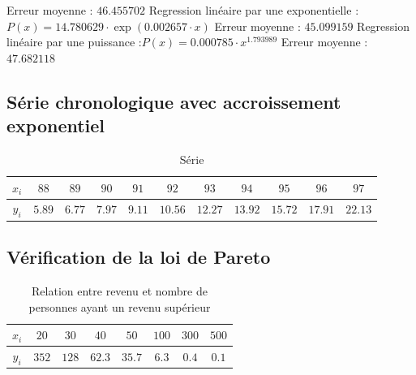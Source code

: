 \documentclass{report}
\begin{document}
	Erreur moyenne : $46.455702$
	\newline
	\newline
	Regression linéaire par une exponentielle :$P(x) = 14.780629 \cdot \exp(0.002657 \cdot x)$
	\newline
	Erreur moyenne : $45.099159$
	\newline
	\newline
	Regression linéaire par une puissance :$P(x) = 0.000785  \cdot x^{1.793989}$
	\newline
	Erreur moyenne : $47.682118$
      \newpage
      
      \subsection{Série chronologique avec accroissement exponentiel}
      
	\begin{table}[h]
	  \centering
	  \begin{tabular}{| c | c | c | c | c | c | c | c | c | c | c |}
	    \hline 
	    $x_{i}$ & $88$ & $89$ & $90$ & $91$ & $92$ & $93$ & $94$ & $95$ & $96$ & $97$ \\ 
	    \hline 
	    $y_{i}$ & $5.89$ & $6.77$ & $7.97$ & $9.11$ & $10.56$ & $12.27$ & $13.92$ & $15.72$ & $17.91$ & $22.13$ \\ 
	    \hline 
	  \end{tabular}
	  \caption{Série}
	  \label{approx_tp2_ex4}
	\end{table}
      \newpage
      
      \subsection{Vérification de la loi de Pareto}
	\begin{table}[h]
	  \centering
	  \begin{tabular}{| c | c | c | c | c | c | c | c |}
	      \hline 
	      $x_{i}$ & $20$ & $30$ & $40$ & $50$ & $100$ & $300$ & $500$ \\ 
	      \hline 
	      $y_{i}$ & $352$ & $128$ & $62.3$ & $35.7$ & $6.3$ & $0.4$ & $0.1$ \\ 
	      \hline 
	  \end{tabular}
	  \caption{Relation entre revenu et nombre de personnes ayant un revenu supérieur}
	  \label{approx_tp2_ex5}
	\end{table}
\end{document}
